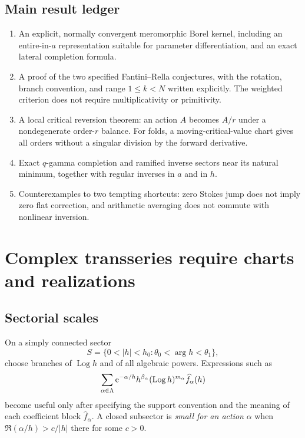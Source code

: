 \documentclass[11pt,a4paper]{article}
\numberwithin{equation}{section}
\theoremstyle{definition}
\theoremstyle{remark}\newtheorem{remark}[theorem]{Remark}
\newcommand{\Log}{\operatorname{Log}}\newcommand{\Li}{\operatorname{Li}}
\begin{document}
\subsection{Main result ledger}
\begin{enumerate}[label=\textbf{R\arabic*.},leftmargin=14mm]
\item An explicit, normally convergent meromorphic Borel kernel,
including an entire-in-$a$ representation suitable for parameter
 differentiation, and an exact lateral completion formula.
\item A proof of the two specified Fantini--Rella conjectures, with the
rotation, branch convention, and range $1\le k<N$ written explicitly.
The weighted criterion does not require multiplicativity or primitivity.
\item A local critical reversion theorem: an action $A$ becomes $A/r$
under a nondegenerate order-$r$ balance. For folds, a moving-critical-value
chart gives all orders without a singular division by the forward derivative.
\item Exact $q$-gamma completion and ramified inverse sectors near its
natural minimum, together with regular inverses in $a$ and in $h$.
\item Counterexamples to two tempting shortcuts: zero Stokes jump does
not imply zero flat correction, and arithmetic averaging does not commute
with nonlinear inversion.
\end{enumerate}

\section{Complex transseries require charts and realizations}
\label{sec:charts}

\subsection{Sectorial scales}
On a simply connected sector
\[
 S=\{0<|h|<h_0:\theta_0<\arg h<\theta_1\},
\]
choose branches of $\Log h$ and of all algebraic powers. Expressions such as
\begin{equation}\label{eq:trans-form}
 \sum_{\alpha\in\Lambda}\e^{-\alpha/h}
 h^{\beta_\alpha}(\Log h)^{m_\alpha}\widehat f_\alpha(h)
\end{equation}
become useful only after specifying the support convention and the
meaning of each coefficient block $\widehat f_\alpha$. A closed subsector
is \emph{small for an action} $\alpha$ when
$\Re(\alpha/h)>c/|h|$ there for some $c>0$.
\end{document}
